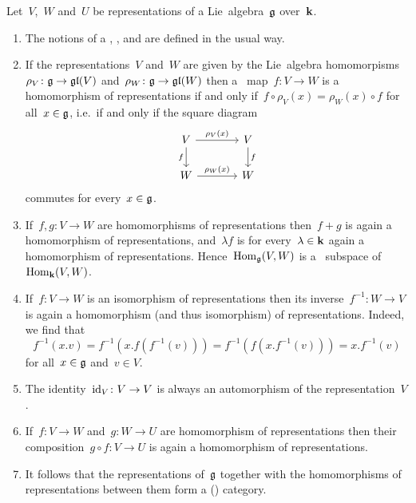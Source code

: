 \begin{remark}
  Let~$V$,~$W$ and~$U$ be representations of a Lie~algebra~$\mathfrak{g}$ over~$\kf$.
  \begin{enumerate}
    \item
      The notions of a , ,  and  are defined in the usual way.
    \item
      If the representations~$V$ and~$W$ are given by the Lie~algebra homomorpisms~$\rho_V \colon \mathfrak{g} \to \mathfrak{gl}(V)$ and~$\rho_W \colon \mathfrak{g} \to \mathfrak{gl}(W)$ then a~{\linear{$\kf$}} map~$f \colon V \to W$ is a homomorphism of representations if and only if~$f \circ \rho_V(x) = \rho_W(x) \circ f$ for all~$x \in \mathfrak{g}$, i.e.\ if and only if the square diagram
      \[
        \begin{tikzcd}[column sep = large]
          V
          \arrow{r}[above]{\rho_V(x)}
          \arrow{d}[left]{f}
          &
          V
          \arrow{d}[right]{f}
          \\
          W
          \arrow{r}[above]{\rho_W(x)}
          &
          W
        \end{tikzcd}
      \]
      commutes for every~$x \in \mathfrak{g}$.
    \item
      If~$f, g \colon V \to W$ are homomorphisms of representations then~$f + g$ is again a homomorphism of representations, and~$\lambda f$ is for every~$\lambda \in \mathbf{k}$ again a homomorphism of representations.
      Hence~$\operatorname{Hom}_{\mathfrak{g}}(V,W)$ is a~{\linear{$\kf$}} subspace of~$\operatorname{Hom}_{\mathbf{k}}(V,W)$.
    \item
      If~$f \colon V \to W$ is an isomorphism of representations then its inverse~$f^{-1} \colon W \to V$ is again a homomorphism (and thus isomorphism) of representations.
      Indeed, we find that
      \[
        f^{-1}(x.v)
        =
        f^{-1}(x.f(f^{-1}(v)))
        =
        f^{-1}(f(x.f^{-1}(v)))
        =
        x.f^{-1}(v)
      \]
      for all~$x \in \mathfrak{g}$ and~$v \in V$.
    \item
      The identity~$\operatorname{id}_V \colon V \to V$ is always an automorphism of the representation~$V$.
    \item
      If~$f \colon V \to W$ and~$g \colon W \to U$ are homomorphism of representations then their composition~$g \circ f \colon V \to U$ is again a homomorphism of representations.
    \item
      It follows that the representations of~$\mathfrak{g}$ together with the homomorphisms of representations between them form a (\linear{$\kf$}) category.
  \end{enumerate}
\end{remark}


